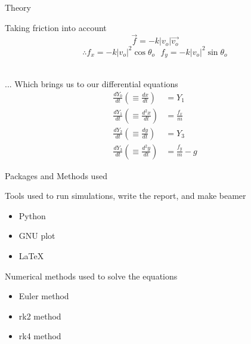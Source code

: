 \documentclass{beamer}
\begin{document}
\begin{frame}[t]{Theory}
\begin{block}{Taking friction into account}
$$\Vec{f} = -k|v_o|\Vec{v_o}$$
$$\therefore f_x = -k|v_o|^2\cos\theta_o\, \, \, \, f_y = -k|v_o|^2\sin\theta_o$$ \\
\end{block} 
\begin{block}{... Which brings us to our differential equations}
\begin{align}
    \frac{dY_0}{dt} \left(\equiv \frac{dx}{dt}\right) &= Y_1 \\
    \frac{dY_1}{dt} \left(\equiv \frac{d^2x}{dt}\right) &= \frac{f_x}{m} \\
    \frac{dY_2}{dt} \left(\equiv \frac{dy}{dt}\right) &= Y_3 \\
    \frac{dY_3}{dt} \left(\equiv \frac{d^2y}{dt}\right) &= \frac{f_y}{m} - g 
\end{align}
\end{block}
\end{frame}
\begin{frame}[t]{Packages and Methods used}
\vspace{6.5pt}
\begin{block}{Tools used to run simulations, write the report, and make beamer}
\begin{itemize}
        \item Python
        \item GNU plot
        \item \LaTeX
    \end{itemize}
\end{block}
\begin{block}{Numerical methods used to solve the equations}
\begin{itemize}
        \item Euler method
        \item rk2 method
        \item rk4 method
    \end{itemize}
\end{block}
\end{frame}
\end{document}
